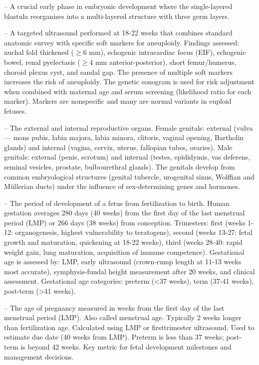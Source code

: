 -- A crucial early phase in embryonic development where the single-layered blastula reorganizes into a multi-layered structure with three germ layers.

-- A targeted ultrasound performed at 18-22 weeks that combines standard anatomic survey with specific soft markers for aneuploidy. Findings assessed: nuchal fold thickened (\(\ge\)6 mm), echogenic intracardiac focus (EIF), echogenic bowel, renal pyelectasis (\(\ge\)4 mm anterior-posterior), short femur/humerus, choroid plexus cyst, and sandal gap. The presence of multiple soft markers increases the risk of aneuploidy. The genetic sonogram is used for risk adjustment when combined with maternal age and serum screening (likelihood ratio for each marker). Markers are nonspecific and many are normal variants in euploid fetuses.

-- The external and internal reproductive organs. Female genitals: external (vulva — mons pubis, labia majora, labia minora, clitoris, vaginal opening, Bartholin glands) and internal (vagina, cervix, uterus, fallopian tubes, ovaries). Male genitals: external (penis, scrotum) and internal (testes, epididymis, vas deferens, seminal vesicles, prostate, bulbourethral glands). The genitals develop from common embryological structures (genital tubercle, urogenital sinus, Wolffian and Müllerian ducts) under the influence of sex-determining genes and hormones.

-- The period of development of a fetus from fertilization to birth. Human gestation averages 280 days (40 weeks) from the first day of the last menstrual period (LMP) or 266 days (38 weeks) from conception. Trimesters: first (weeks 1-12: organogenesis, highest vulnerability to teratogens), second (weeks 13-27: fetal growth and maturation, quickening at 18-22 weeks), third (weeks 28-40: rapid weight gain, lung maturation, acquisition of immune competence). Gestational age is assessed by: LMP, early ultrasound (crown-rump length at 11-13 weeks most accurate), symphysis-fundal height measurement after 20 weeks, and clinical assessment. Gestational age categories: preterm (<37 weeks), term (37-41 weeks), post-term (>41 weeks).

-- The age of pregnancy measured in weeks from the first day of the last menstrual period (LMP). Also called menstrual age. Typically 2 weeks longer than fertilization age. Calculated using LMP or firsttrimester ultrasound. Used to estimate due date (40 weeks from LMP). Preterm is less than 37 weeks; post-term is beyond 42 weeks. Key metric for fetal development milestones and management decisions.

